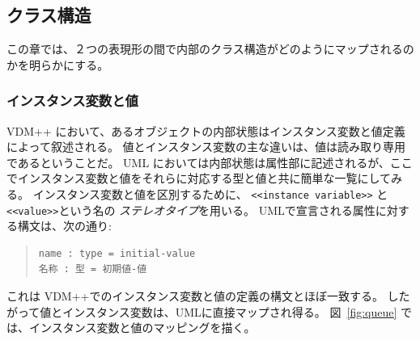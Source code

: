 \documentclass[\pformat,12pt]{jarticle}
\newcommand{\vdmpp}{VDM++}
\begin{document}
\subsection{クラス構造} \label{classstructure}
  
この章では、２つの表現形の間で内部のクラス構造がどのようにマップされるのかを明らかにする。

\subsubsection*{インスタンス変数と値}
 
\vdmpp{} において、あるオブジェクトの内部状態はインスタンス変数と値定義によって叙述される。
値とインスタンス変数の主な違いは、値は読み取り専用であるということだ。
UML においては内部状態は属性部に記述されるが、ここでインスタンス変数と値をそれらに対応する型と値と共に簡単な一覧にしてみる。
 インスタンス変数と値を区別するために、 {\tt <<instance variable>>} と {\tt <<value>>}という名の {\it ステレオタイプ}を用いる。 
UMLで宣言される属性に対する構文は、次の通り:  

\begin{quote}
\begin{verbatim}
name : type = initial-value
名称 : 型 = 初期値-値
\end{verbatim}
\end{quote}

これは \vdmpp{}でのインスタンス変数と値の定義の構文とほぼ一致する。
したがって値とインスタンス変数は、UMLに直接マップされ得る。
図~\ref{fig:queue} では、インスタンス変数と値のマッピングを描く。

%
\end{document}
